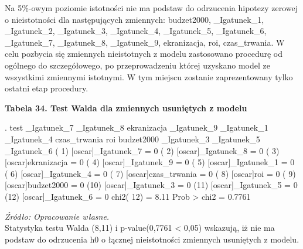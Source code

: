 Na 5\%-owym poziomie istotności nie ma podstaw do odrzucenia hipotezy zerowej o nieistotności dla następujących zmiennych: budzet2000, _Igatunek_1, _Igatunek_2, _Igatunek_3, _Igatunek_4, _Igatunek_5, _Igatunek_6, _Igatunek_7, _Igatunek_8, _Igatunek_9, ekranizacja, roi, czas_trwania. W celu pozbycia się zmiennych nieistotnych z modelu zastosowano procedurę od ogólnego do szczegółowego, po przeprowadzeniu której uzyskano model ze wszystkimi zmiennymi istotnymi. W tym miejscu zostanie zaprezentowany tylko ostatni etap procedury.

\vspace{0.5cm}
\textbf{Tabela 34. Test Walda dla zmiennych usuniętych z modelu}
\begin{stlog}
. test _Igatunek_7 _Igatunek_8 ekranizacja _Igatunek_9 _Igatunek_1 _Igatunek_4  czas_trwania roi 
budzet2000 _Igatunek_3 _Igatunek_5 _Igatunek_6
{\smallskip}
 ( 1)  [oscar]_Igatunek_7 = 0
 ( 2)  [oscar]_Igatunek_8 = 0
 ( 3)  [oscar]ekranizacja = 0
 ( 4)  [oscar]_Igatunek_9 = 0
 ( 5)  [oscar]_Igatunek_1 = 0
 ( 6)  [oscar]_Igatunek_4 = 0
 ( 7)  [oscar]czas_trwania = 0
 ( 8)  [oscar]roi = 0
 ( 9)  [oscar]budzet2000 = 0
 (10)  [oscar]_Igatunek_3 = 0
 (11)  [oscar]_Igatunek_5 = 0
 (12)  [oscar]_Igatunek_6 = 0
{\smallskip}
           chi2( 12) =    8.11
         Prob > chi2 =    0.7761
\end{stlog}
\textit{\footnotesize{Źródło: Opracowanie własne.}} \\

Statystyka testu Walda (8,11) i p-value(0,7761 < 0,05) wskazują, iż nie ma podstaw do odrzucenia h0 o łącznej nieistotności zmiennych usuniętych z modelu.

